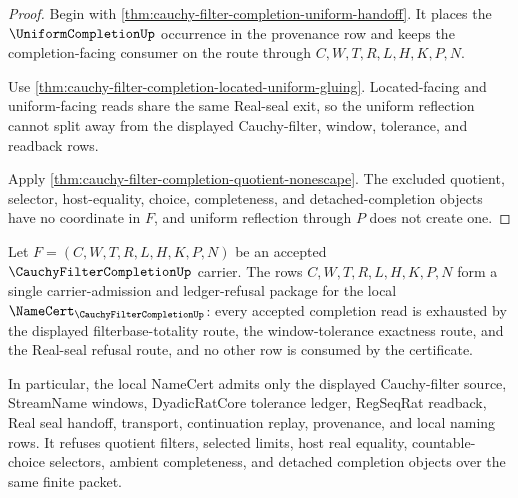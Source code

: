 \begin{proof}
Begin with \autoref{thm:cauchy-filter-completion-uniform-handoff}. It places the $\UniformCompletionUp$ occurrence in the provenance row and keeps the completion-facing consumer on the route through $C,W,T,R,L,H,K,P,N$.

Use \autoref{thm:cauchy-filter-completion-located-uniform-gluing}. Located-facing and uniform-facing reads share the same Real-seal exit, so the uniform reflection cannot split away from the displayed Cauchy-filter, window, tolerance, and readback rows.

Apply \autoref{thm:cauchy-filter-completion-quotient-nonescape}. The excluded quotient, selector, host-equality, choice, completeness, and detached-completion objects have no coordinate in $F$, and uniform reflection through $P$ does not create one.
\end{proof}
\begin{theorem}
\label{thm:cauchy-filter-completion-carrier-ledger-package}
Let $F=(C,W,T,R,L,H,K,P,N)$ be an accepted $\CauchyFilterCompletionUp$ carrier. The rows $C,W,T,R,L,H,K,P,N$ form a single carrier-admission and ledger-refusal package for the local $\NameCert_{\CauchyFilterCompletionUp}$: every accepted completion read is exhausted by the displayed filterbase-totality route, the window-tolerance exactness route, and the Real-seal refusal route, and no other row is consumed by the certificate.

In particular, the local NameCert admits only the displayed Cauchy-filter source, StreamName windows, DyadicRatCore tolerance ledger, RegSeqRat readback, Real seal handoff, transport, continuation replay, provenance, and local naming rows. It refuses quotient filters, selected limits, host real equality, countable-choice selectors, ambient completeness, and detached completion objects over the same finite packet.
\end{theorem}
